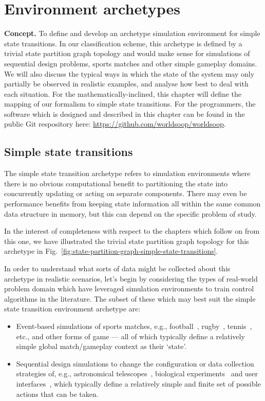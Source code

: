 \chapter{\sffamily Environment archetypes}

{\bfseries\sffamily Concept.} To define and develop an archetype simulation environment for simple state transitions. In our classification scheme, this archetype is defined by a trivial state partition graph topology and would make sense for simulations of sequential design problems, sports matches and other simple gameplay domains. We will also discuss the typical ways in which the state of the system may only partially be observed in realistic examples, and analyse how best to deal with each situation. For the mathematically-inclined, this chapter will define the mapping of our formalism to simple state transitions. For the programmers, the software which is designed and described in this chapter can be found in the public Git respository here: \href{https://github.com/worldsoop/worldsoop}{https://github.com/worldsoop/worldsoop}.


\section{\sffamily Simple state transitions}

The simple state transition archetype refers to simulation environments where there is no obvious computational benefit to partitioning the state into concurrently updating or acting on separate components. There may even be performance benefits from keeping state information all within the same common data structure in memory, but this can depend on the specific problem of study. 

In the interest of completeness with respect to the chapters which follow on from this one, we have illustrated the trivial state partition graph topology for this archetype in Fig.~\ref{fig:state-partition-graph-simple-state-transitions}.

In order to understand what sorts of data might be collected about this archetype in realistic scenarios, let's begin by considering the types of real-world problem domain which have leveraged simulation environments to train control algorithms in the literature. The subset of these which may best suit the simple state transition environment archetype are:
\begin{itemize}
\item{Event-based simulations of sports matches, e.g., football~\cite{pulis2022reinforcement}, rugby~\cite{sawczuk2022markov}, tennis~\cite{ding2022deep}, etc., and other forms of game --- all of which typically define a relatively simple global match/gameplay context as their `state'.}
\item{Sequential design simulations to change the configuration or data collection strategies of, e.g., astronomical telescopes~\cite{jia2023observation,yatawatta2021deep}, biological experiments~\cite{treloar2022deep} and user interfaces~\cite{lomas2016interface}, which typically define a relatively simple and finite set of possible actions that can be taken.}
\end{itemize}

